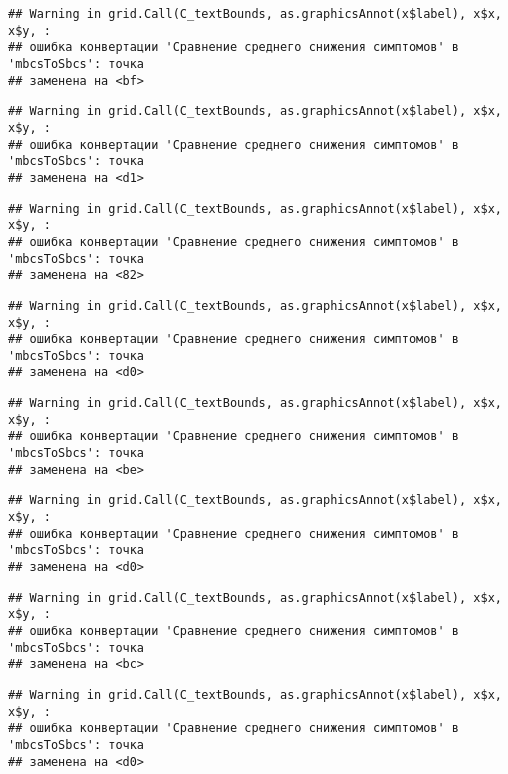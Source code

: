 \documentclass[
]{article}
\begin{document}
\begin{verbatim}
## Warning in grid.Call(C_textBounds, as.graphicsAnnot(x$label), x$x, x$y, :
## ошибка конвертации 'Сравнение среднего снижения симптомов' в 'mbcsToSbcs': точка
## заменена на <bf>
\end{verbatim}

\begin{verbatim}
## Warning in grid.Call(C_textBounds, as.graphicsAnnot(x$label), x$x, x$y, :
## ошибка конвертации 'Сравнение среднего снижения симптомов' в 'mbcsToSbcs': точка
## заменена на <d1>
\end{verbatim}

\begin{verbatim}
## Warning in grid.Call(C_textBounds, as.graphicsAnnot(x$label), x$x, x$y, :
## ошибка конвертации 'Сравнение среднего снижения симптомов' в 'mbcsToSbcs': точка
## заменена на <82>
\end{verbatim}

\begin{verbatim}
## Warning in grid.Call(C_textBounds, as.graphicsAnnot(x$label), x$x, x$y, :
## ошибка конвертации 'Сравнение среднего снижения симптомов' в 'mbcsToSbcs': точка
## заменена на <d0>
\end{verbatim}

\begin{verbatim}
## Warning in grid.Call(C_textBounds, as.graphicsAnnot(x$label), x$x, x$y, :
## ошибка конвертации 'Сравнение среднего снижения симптомов' в 'mbcsToSbcs': точка
## заменена на <be>
\end{verbatim}

\begin{verbatim}
## Warning in grid.Call(C_textBounds, as.graphicsAnnot(x$label), x$x, x$y, :
## ошибка конвертации 'Сравнение среднего снижения симптомов' в 'mbcsToSbcs': точка
## заменена на <d0>
\end{verbatim}

\begin{verbatim}
## Warning in grid.Call(C_textBounds, as.graphicsAnnot(x$label), x$x, x$y, :
## ошибка конвертации 'Сравнение среднего снижения симптомов' в 'mbcsToSbcs': точка
## заменена на <bc>
\end{verbatim}

\begin{verbatim}
## Warning in grid.Call(C_textBounds, as.graphicsAnnot(x$label), x$x, x$y, :
## ошибка конвертации 'Сравнение среднего снижения симптомов' в 'mbcsToSbcs': точка
## заменена на <d0>
\end{verbatim}
\end{document}
